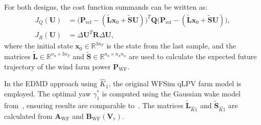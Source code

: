 For both designs, the cost function summands can be written as:
\begin{align*} 
    J_Q (\bm{U}) &= \big(\bm{P}_{\text{ref}} - (\tilde{\bm{L}} \bm{x}_0 + \tilde{\bm{S}} \bm{U})\big)^T \bm{Q} \big(\bm{P}_{\text{ref}} - (\tilde{\bm{L}} \bm{x}_0 + \tilde{\bm{S}} \bm{U})\big),\\
    J_R (\bm{U}) &= \Delta \bm{U}^T \bm{R} \Delta \bm{U},
\end{align*}
where the initial state $\bm{x}_0 \in \mathbb{R}^{3 n_T}$ is the state from the last sample, and the matrices $\tilde{\bm{L}} \in \mathbb{R}^{n_h \times 3 n_T}$ and $\tilde{\bm{S}} \in \mathbb{R}^{n_h \times n_h n_u}$ are used to calculate the expected future trajectory of the wind farm power $\bm{P}_{\text{WF}}$.

In the EDMD approach using $\hat{K}_1$, the original WFSim qLPV farm model is employed. The optimal yaw $\gamma_1^*$ is computed using the Gaussian wake model from~\cite{bastankhah2016experimental}, ensuring results are comparable to~\cite{boersma2019constrained}. The matrices $\tilde{\bm{L}}_{\hat{K}1}$ and $\tilde{\bm{S}}_{\hat{K}1}$ are calculated from $\bm{A}_{\text{WF}}$ and $\bm{B}_{\text{WF}}(\bm{V}_r)$.

